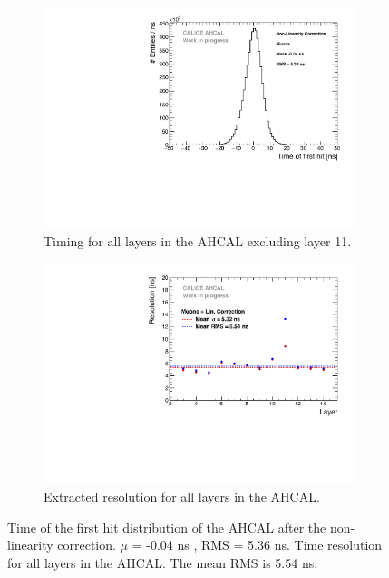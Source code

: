 \begin{figure}[htbp!]
	\begin{subfigure}[t]{0.5\textwidth}
		\centering
		\includegraphics[width=1\textwidth]{chap5/fig_AHCAL_timing/Muons/Timing_AHCAL_LinCorrection.pdf}
		\caption{Timing for all layers in the AHCAL excluding layer 11.}\label{fig:timing_lincorrection}
	\end{subfigure}
	\hfill
	\begin{subfigure}[t]{0.5\textwidth}
		\centering
		\includegraphics[width=1\textwidth]{chap5/fig_AHCAL_timing/Muons/ResolutionPerModule_LinCorrection.pdf}
		\caption{Extracted resolution for all layers in the AHCAL.}\label{fig:reso_lincorrection}
	\end{subfigure}
	\caption{ Time of the first hit distribution of the AHCAL after the non-linearity correction. $\mu$ = -0.04 ns , RMS = 5.36 ns.  Time resolution for all layers in the AHCAL. The mean RMS is 5.54 ns.}
\end{figure}

